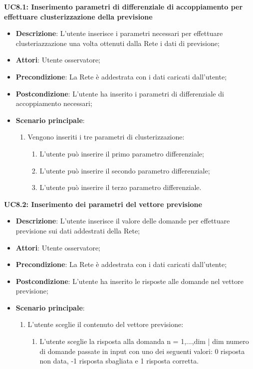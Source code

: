 \textbf{UC8.1: Inserimento parametri di differenziale di accoppiamento per effettuare clusterizzazione della previsione}
\label{UC8.1: Inserimento parametri di differenziale di accoppiamento per effettuare clusterizzazione della previsione}
\noindent
\begin{itemize}
\item \textbf{Descrizione}: L'utente inserisce i parametri necessari per effettuare clusteriazzazione una volta ottenuti dalla Rete i dati di previsione;
\item \textbf{Attori}: Utente osservatore;
\item \textbf{Precondizione}: La Rete \`e addestrata con i dati caricati dall'utente;
\item \textbf{Postcondizione}: L'utente ha inserito i parametri di differenziale di accoppiamento necessari;
\item \textbf{Scenario principale}:
\begin{enumerate} 
\item Vengono inseriti i tre parametri di clusterizzazione:
\begin{enumerate}
\item L'utente pu\`o inserire il primo parametro differenziale;
\item L'utente pu\`o inserire il secondo parametro differenziale;
\item L'utente pu\`o inserire il terzo parametro differenziale.
\end{enumerate}
\end{enumerate}
\end{itemize}

\textbf{UC8.2: Inserimento dei parametri del vettore previsione}\mbox{}
\label{UC8.2: Inserimento dei parametri del vettore previsione}
\noindent
\begin{itemize}
\item \textbf{Descrizione}: L'utente inserisce il valore delle domande per effettuare previsione sui dati addestrati della Rete;
\item \textbf{Attori}: Utente osservatore;
\item \textbf{Precondizione}: La Rete \`e addestrata con i dati caricati dall'utente;
\item \textbf{Postcondizione}: L'utente ha inserito le risposte alle domande nel vettore previsione;
\item \textbf{Scenario principale}:
\begin{enumerate}
\item L'utente sceglie il contenuto del vettore previsione:
\begin{enumerate}
\item L'utente sceglie la risposta alla domanda n = {1,...,dim | dim numero di domande passate in input} con uno dei seguenti valori: 0 risposta non data, -1 risposta sbagliata e 1 risposta corretta.
\end{enumerate}
\end{enumerate}
\end{itemize}

